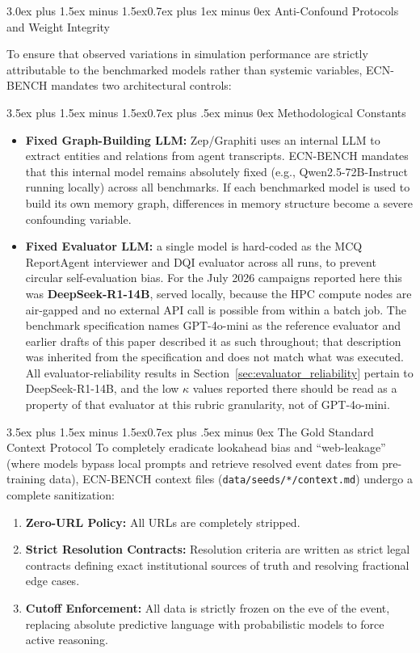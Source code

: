\documentclass[11pt,journal,onecolumn]{IEEEtran}
\makeatletter
\renewcommand\section{\@startsection{section}{1}{\z@}%
  {3.0ex plus 1.5ex minus 1.5ex}{0.7ex plus 1ex minus 0ex}%
  {\normalfont\normalsize\centering\bfseries}}
\renewcommand\subsection{\@startsection{subsection}{2}{\z@}%
  {3.5ex plus 1.5ex minus 1.5ex}{0.7ex plus .5ex minus 0ex}%
  {\normalfont\normalsize\bfseries}}
\makeatother
\begin{document}
\section{Anti-Confound Protocols and Weight Integrity}
\label{sec:confound}

To ensure that observed variations in simulation performance are strictly attributable to the benchmarked models rather than systemic variables, ECN-BENCH mandates two architectural controls:

\subsection{Methodological Constants}
\begin{itemize}
    \item \textbf{Fixed Graph-Building LLM:} Zep/Graphiti uses an internal LLM to extract entities and relations from agent transcripts. ECN-BENCH mandates that this internal model remains absolutely fixed (e.g., Qwen2.5-72B-Instruct running locally) across all benchmarks. If each benchmarked model is used to build its own memory graph, differences in memory structure become a severe confounding variable.
    \item \textbf{Fixed Evaluator LLM:} a single model is hard-coded as the MCQ ReportAgent interviewer and DQI evaluator across all runs, to prevent circular self-evaluation bias. For the July 2026 campaigns reported here this was \textbf{DeepSeek-R1-14B}, served locally, because the HPC compute nodes are air-gapped and no external API call is possible from within a batch job. The benchmark specification names GPT-4o-mini as the reference evaluator and earlier drafts of this paper described it as such throughout; that description was inherited from the specification and does not match what was executed. All evaluator-reliability results in Section~\ref{sec:evaluator_reliability} pertain to DeepSeek-R1-14B, and the low $\kappa$ values reported there should be read as a property of that evaluator at this rubric granularity, not of GPT-4o-mini.
\end{itemize}

\subsection{The Gold Standard Context Protocol}
To completely eradicate lookahead bias and ``web-leakage'' (where models bypass local prompts and retrieve resolved event dates from pre-training data), ECN-BENCH context files (\texttt{data/seeds/*/context.md}) undergo a complete sanitization:
\begin{enumerate}
    \item \textbf{Zero-URL Policy:} All URLs are completely stripped.
    \item \textbf{Strict Resolution Contracts:} Resolution criteria are written as strict legal contracts defining exact institutional sources of truth and resolving fractional edge cases.
    \item \textbf{Cutoff Enforcement:} All data is strictly frozen on the eve of the event, replacing absolute predictive language with probabilistic models to force active reasoning.
\end{enumerate}
\end{document}
